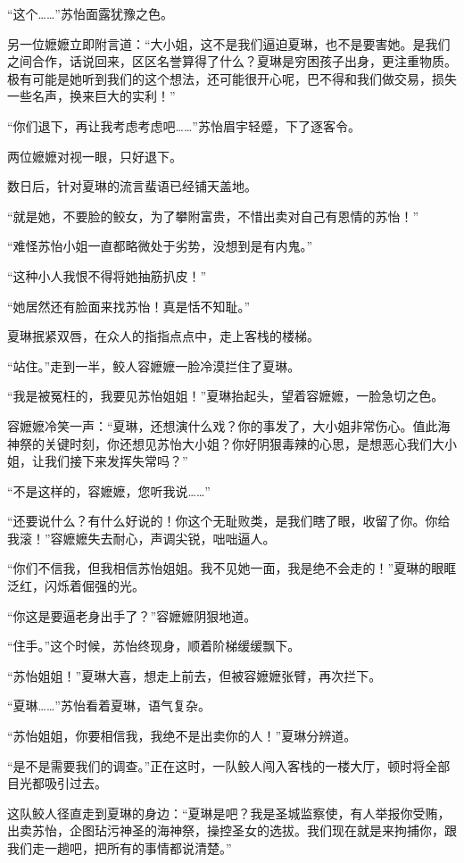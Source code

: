 \begin{this_body}
“这个……”苏怡面露犹豫之色。

另一位嬷嬷立即附言道：“大小姐，这不是我们逼迫夏琳，也不是要害她。是我们之间合作，话说回来，区区名誉算得了什么？夏琳是穷困孩子出身，更注重物质。极有可能是她听到我们的这个想法，还可能很开心呢，巴不得和我们做交易，损失一些名声，换来巨大的实利！”

“你们退下，再让我考虑考虑吧……”苏怡眉宇轻蹙，下了逐客令。

两位嬷嬷对视一眼，只好退下。

数日后，针对夏琳的流言蜚语已经铺天盖地。

“就是她，不要脸的鲛女，为了攀附富贵，不惜出卖对自己有恩情的苏怡！”

“难怪苏怡小姐一直都略微处于劣势，没想到是有内鬼。”

“这种小人我恨不得将她抽筋扒皮！”

“她居然还有脸面来找苏怡！真是恬不知耻。”

夏琳抿紧双唇，在众人的指指点点中，走上客栈的楼梯。

“站住。”走到一半，鲛人容嬷嬷一脸冷漠拦住了夏琳。

“我是被冤枉的，我要见苏怡姐姐！”夏琳抬起头，望着容嬷嬷，一脸急切之色。

容嬷嬷冷笑一声：“夏琳，还想演什么戏？你的事发了，大小姐非常伤心。值此海神祭的关键时刻，你还想见苏怡大小姐？你好阴狠毒辣的心思，是想恶心我们大小姐，让我们接下来发挥失常吗？”

“不是这样的，容嬷嬷，您听我说……”

“还要说什么？有什么好说的！你这个无耻败类，是我们瞎了眼，收留了你。你给我滚！”容嬷嬷失去耐心，声调尖锐，咄咄逼人。

“你们不信我，但我相信苏怡姐姐。我不见她一面，我是绝不会走的！”夏琳的眼眶泛红，闪烁着倔强的光。

“你这是要逼老身出手了？”容嬷嬷阴狠地道。

“住手。”这个时候，苏怡终现身，顺着阶梯缓缓飘下。

“苏怡姐姐！”夏琳大喜，想走上前去，但被容嬷嬷张臂，再次拦下。

“夏琳……”苏怡看着夏琳，语气复杂。

“苏怡姐姐，你要相信我，我绝不是出卖你的人！”夏琳分辨道。

“是不是需要我们的调查。”正在这时，一队鲛人闯入客栈的一楼大厅，顿时将全部目光都吸引过去。

这队鲛人径直走到夏琳的身边：“夏琳是吧？我是圣城监察使，有人举报你受贿，出卖苏怡，企图玷污神圣的海神祭，操控圣女的选拔。我们现在就是来拘捕你，跟我们走一趟吧，把所有的事情都说清楚。”


\end{this_body}
